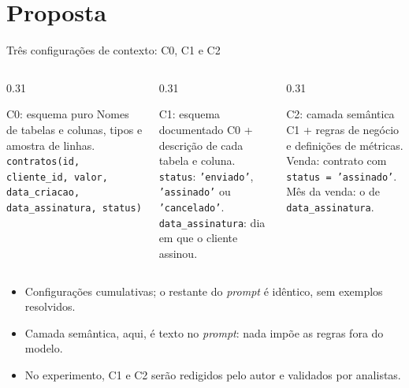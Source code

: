 \documentclass[aspectratio=169,10pt]{beamer}
\begin{document}
\section{Proposta}

\begin{frame}{Três configurações de contexto: C0, C1 e C2}
  \small
  \begin{columns}[T,onlytextwidth]
    \begin{column}{0.31\textwidth}
      \begin{alertblock}{\small C0: esquema puro}
        \footnotesize
        Nomes de tabelas e colunas, tipos e amostra de linhas.\\[1.5mm]
        \texttt{contratos(id, cliente\_id, valor, data\_criacao, data\_assinatura, status)}
      \end{alertblock}
    \end{column}
    \begin{column}{0.31\textwidth}
      \begin{block}{\small C1: esquema documentado}
        \footnotesize
        C0 + descrição de cada tabela e coluna.\\[1.5mm]
        \texttt{status}: \texttt{'enviado'}, \texttt{'assinado'} ou \texttt{'cancelado'}.\\
        \texttt{data\_assinatura}: dia em que o cliente assinou.
      \end{block}
    \end{column}
    \begin{column}{0.31\textwidth}
      \begin{exampleblock}{\small C2: camada semântica}
        \footnotesize
        C1 + regras de negócio e definições de métricas.\\[1.5mm]
        Venda: contrato com \texttt{status = 'assinado'}.\\
        Mês da venda: o de \texttt{data\_assinatura}.
      \end{exampleblock}
    \end{column}
  \end{columns}
  \vspace{3mm}
  \begin{itemize}
    \item Configurações cumulativas; o restante do \textit{prompt} é idêntico, sem exemplos resolvidos.
    \item Camada semântica, aqui, é texto no \textit{prompt}: nada impõe as regras fora do modelo.
    \item No experimento, C1 e C2 serão redigidos pelo autor e validados por analistas.
  \end{itemize}
\end{frame}
\end{document}
